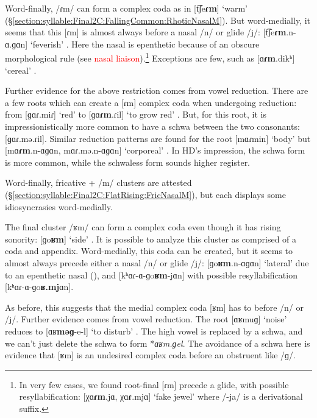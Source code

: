	Word-finally, /ɾm/ can form a complex coda as in [t͡ʃe\textbf{ɾm}]  `warm'  (\S\ref{section:syllable:Final2C:FallingCommon:RhoticNasalM}). But word-medially, it seems that this [ɾm] is almost always before  a nasal /n/ or glide /j/: [t͡ʃe\textbf{ɾm}.n-ɑ.ɡɑn] `feverish' . Here the nasal is epenthetic because of an obscure morphological rule (see \textcolor{red}{nasal liaison}).\footnote{In very few cases, we found root-final [ɾm] precede a glide, with possible resyllabification: [χɑ\textbf{ɾm}.jɑ, χɑ\textbf{ɾ}.mjɑ] `fake jewel'  where /-ja/ is a derivational suffix.}  Exceptions are few, such as [ɑ\textbf{ɾm}.dikʰ] `cereal' . 
	
	
	Further evidence for the above  restriction comes from vowel reduction. There are a few roots which can create a [ɾm] complex coda when undergoing reduction: from [ɡɑɾ.miɾ] `red'  to [ɡɑ\textbf{ɾm}.ɾil] `to grow red' . But, for this root, it is impressionistically more common to have a schwa between the two consonants: [ɡɑɾ.mə.ɾil]. Similar reduction patterns are found for the root [mɑɾmin] `body'  but [mɑ\textbf{ɾm}.n-ɑɡɑn, mɑɾ.mə.n-ɑɡɑn] `corporeal' . In HD's impression, the schwa form is more common, while the schwaless form sounds higher register. 
	
	
	Word-finally, fricative + /m/ clusters are attested (\S\ref{section:syllable:Final2C:FlatRising:FricNasalM}), but each displays some idiosyncrasies word-medially. 
	
	The final cluster /ʁm/ can form a complex coda even though it has rising sonority: [ɡo\textbf{ʁm}] `side' .  It is possible to analyze this cluster as comprised of a coda and appendix. Word-medially, this coda can be created, but it seems to almost always precede either a nasal /n/ or glide /j/: [ɡo\textbf{ʁm}.n-ɑɡɑn] `lateral'  due to an epenthetic nasal (), and [kʰɑɾ-ɑ-ɡo\textbf{ʁm}-jɑn]   with possible resyllabification  [kʰɑɾ-ɑ-ɡo\textbf{ʁ.mj}ɑn]. 
	
	As before,   this suggests that the medial complex coda [ʁm] has to before /n/ or /j/. Further evidence comes from vowel reduction. The root [ɑʁmuɡ] `noise'  reduces to [ɑʁ\textbf{məɡ}-e-l] `to disturb' . The high vowel is replaced by a schwa, and we can't just delete the schwa to form *\textit{ɑʁm.ɡel}. The avoidance of a schwa here is evidence that [ʁm] is an undesired complex coda before an obstruent like /ɡ/. 
	

